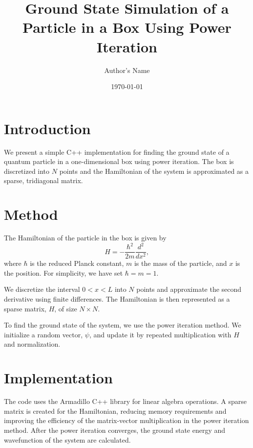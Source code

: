 \documentclass{article}
\begin{document}
\title{Ground State Simulation of a Particle in a Box Using Power Iteration}
\author{Author's Name}
\date{\today}
\maketitle

\section{Introduction}
We present a simple C++ implementation for finding the ground state of
a quantum particle in a one-dimensional box using power iteration. The
box is discretized into $N$ points and the Hamiltonian of the system
is approximated as a sparse, tridiagonal matrix.

\section{Method}
The Hamiltonian of the particle in the box is given by
\begin{equation}
H = -\frac{{\hbar}^2}{2m} \frac{d^2}{dx^2},
\end{equation}
where $\hbar$ is the reduced Planck constant, $m$ is the mass of the
particle, and $x$ is the position. For simplicity, we have set $\hbar
= m = 1$.

We discretize the interval $0 < x < L$ into $N$ points and approximate
the second derivative using finite differences. The Hamiltonian is
then represented as a sparse matrix, $H$, of size $N \times N$.

To find the ground state of the system, we use the power iteration
method. We initialize a random vector, $\psi$, and update it by
repeated multiplication with $H$ and normalization.

\section{Implementation}
The code uses the Armadillo C++ library for linear algebra
operations. A sparse matrix is created for the Hamiltonian, reducing
memory requirements and improving the efficiency of the matrix-vector
multiplication in the power iteration method. After the power
iteration converges, the ground state energy and wavefunction of the
system are calculated.
\end{document}
